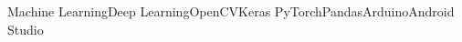 \begin{cventries}
{Machine Learning{\enskip\cdotp\enskip}Deep Learning{\enskip\cdotp\enskip}OpenCV{\enskip\cdotp\enskip}Keras{\enskip\cdotp\enskip} PyTorch{\enskip\cdotp\enskip}Pandas{\enskip\cdotp\enskip}Arduino{\enskip\cdotp\enskip}Android Studio
}

\end{cventries}